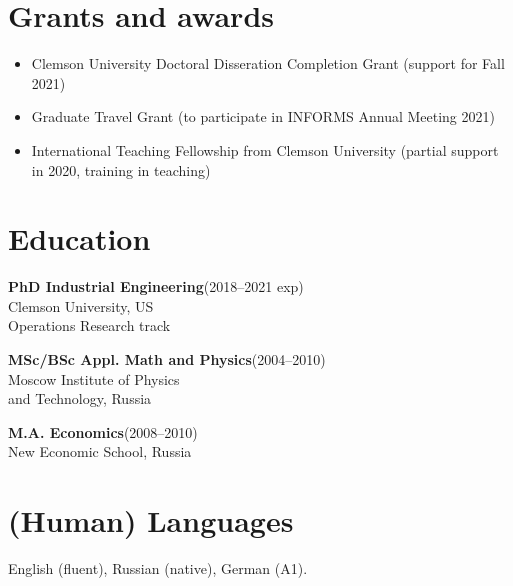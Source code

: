 \documentclass[11pt]{article} \usepackage{geometry} %
\newcommand{\edu}[3]{
  \textbf{#1}\hfill (#2)\\
  #3\vspace{0.7em}}
\begin{document}
 \section*{Grants and awards}
 \begin{itemize}
 \itemsep0pt 
    \item Clemson University Doctoral Disseration Completion Grant (support for Fall 2021)
    \item Graduate Travel Grant (to participate in INFORMS Annual Meeting 2021)
    \item International Teaching Fellowship from Clemson University (partial
      support in 2020, training in teaching)
 \end{itemize}
 \noindent
 \begin{minipage}[t]{0.49\textwidth}
   \section*{Education} 
   \edu{PhD Industrial Engineering}{2018--2021 exp}{
     Clemson University, US\\
     Operations Research track}

   \edu{MSc/BSc Appl. Math and Physics}{2004--2010}{
     Moscow Institute of Physics\\
     and Technology, Russia}

   \edu{M.A. Economics}{2008--2010}{
   New Economic School, Russia}


\section*{(Human) Languages}
English (fluent), Russian (native), German (A1).

\end{minipage}\hfill%
\end{document}
